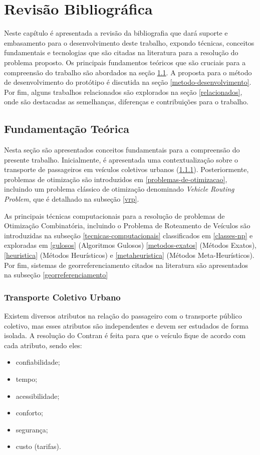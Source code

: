 \chapter{Revisão Bibliográfica}

Neste capítulo é apresentada a revisão da bibliografia que dará suporte e embasamento para o desenvolvimento deste trabalho, expondo técnicas, conceitos fundamentais e tecnologias que são citadas na literatura para a resolução do problema proposto. Os principais fundamentos teóricos que são cruciais para a compreensão do trabalho são abordados na seção \ref{fundamentacao}. A proposta para o método de desenvolvimento do protótipo é discutida na seção \ref{metodo-desenvolvimento}. Por fim, alguns trabalhos relacionados são explorados na seção \ref{relacionados}, onde são destacadas as semelhanças, diferenças e contribuições para o trabalho.

\section{Fundamentação Teórica}\label{fundamentacao}
Nesta seção são apresentados conceitos fundamentais para a compreensão do presente trabalho. Inicialmente, é apresentada uma contextualização sobre o transporte de passageiros em veículos coletivos urbanos (\ref{transporte-urbano}). Posteriormente, problemas de otimização são introduzidos em \ref{problemas-de-otimizacao}, incluindo um problema clássico de otimização denominado \emph{Vehicle Routing Problem}, que é detalhado na subseção \ref{vrp}. 

As principais técnicas computacionais para a resolução de problemas de Otimização Combinatória, incluindo o Problema de Roteamento de Veículos são introduzidas na subseção \ref{tecnicas-computacionais} classificados em \ref{classes-np} e exploradas em \ref{gulosos} (Algoritmos Gulosos) \ref{metodos-exatos} (Métodos Exatos), \ref{heuristica} (Métodos Heurísticos) e \ref{metaheuristica} (Métodos Meta-Heurísticos). Por fim, sistemas de georreferenciamento citados na literatura são apresentados na subseção \ref{georreferenciamento}

\subsection{Transporte Coletivo Urbano}\label{transporte-urbano}
Existem diversos atributos na relação do passageiro com o transporte público coletivo, mas esses atributos são independentes e devem ser estudados de forma isolada. A resolução do Contran \cite{denatran} é feita para que o veículo fique de acordo com cada atributo, sendo eles:
\begin{itemize}
    \item confiabilidade;
    \item tempo;
    \item acessibilidade;
    \item conforto;
    \item segurança;
    \item custo (tarifas).
\end{itemize}

